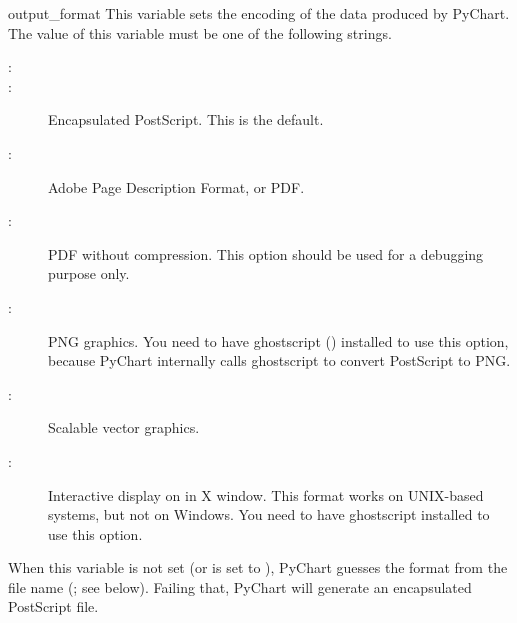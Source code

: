 \documentclass{howto}
\newcommand{\pychart}{PyChart}
\begin{document}
\begin{datadesc}{output_format}
This variable sets the encoding of the data produced by \pychart{}.
The value of this variable must be one of the following strings.

\begin{description}
\item[:]
\item[:]
Encapsulated PostScript. This is the default.

\item[:]
Adobe Page Description Format, or PDF.

\item[:]
PDF without compression.
This option should be used for a debugging purpose only.

\item[:]
PNG graphics.  You need to have ghostscript () installed to use
this option, because \pychart{} internally calls ghostscript to convert
PostScript to PNG.

\begin{seealso}
\end{seealso}

\item[:]
Scalable vector graphics.

\begin{seealso}
\end{seealso}

\item[:]
Interactive display on in X window. This format works on UNIX-based
systems, but not on Windows. You need to have ghostscript installed to
use this option.

\end{description}

When this variable is not set (or is set to ),
\pychart{} guesses the format from the file name
(; see below).
Failing that, \pychart{} will generate
an encapsulated PostScript file.

\end{datadesc}
\end{document}
